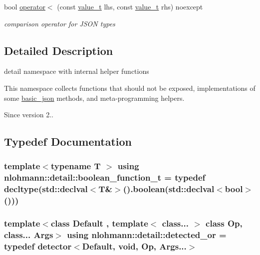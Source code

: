 \begin{DoxyCompactItemize}
\item 
bool \hyperlink{namespacenlohmann_1_1detail_a09169efff3bd1771fff29bd92cea19e0}{operator$<$} (const \hyperlink{namespacenlohmann_1_1detail_a1ed8fc6239da25abcaf681d30ace4985}{value\+\_\+t} lhs, const \hyperlink{namespacenlohmann_1_1detail_a1ed8fc6239da25abcaf681d30ace4985}{value\+\_\+t} rhs) noexcept
\begin{DoxyCompactList}\small\item\em comparison operator for J\+S\+ON types \end{DoxyCompactList}\end{DoxyCompactItemize}


\subsection{Detailed Description}
detail namespace with internal helper functions 

This namespace collects functions that should not be exposed, implementations of some \hyperlink{classnlohmann_1_1basic__json}{basic\+\_\+json} methods, and meta-\/programming helpers.

\begin{DoxySince}{Since}
version 2.. 
\end{DoxySince}


\subsection{Typedef Documentation}
\subsubsection[{\texorpdfstring{boolean\+\_\+function\+\_\+t}{boolean_function_t}}]{\setlength{\rightskip}{0pt plus 5cm}template$<$typename T $>$ using {\bf nlohmann\+::detail\+::boolean\+\_\+function\+\_\+t} = typedef decltype(std\+::declval$<$T\&$>$().boolean(std\+::declval$<$bool$>$()))}\hypertarget{namespacenlohmann_1_1detail_a45ec87326503b8884b664a9ef23a6c99}{}\label{namespacenlohmann_1_1detail_a45ec87326503b8884b664a9ef23a6c99}
\subsubsection[{\texorpdfstring{detected\+\_\+or}{detected_or}}]{\setlength{\rightskip}{0pt plus 5cm}template$<$class Default , template$<$ class... $>$ class Op, class... Args$>$ using {\bf nlohmann\+::detail\+::detected\+\_\+or} = typedef {\bf detector}$<$Default, {\bf void}, Op, Args...$>$}\hypertarget{namespacenlohmann_1_1detail_a240ce21919ab08e8a6cb3a5cfa412bce}{}\label{namespacenlohmann_1_1detail_a240ce21919ab08e8a6cb3a5cfa412bce}
